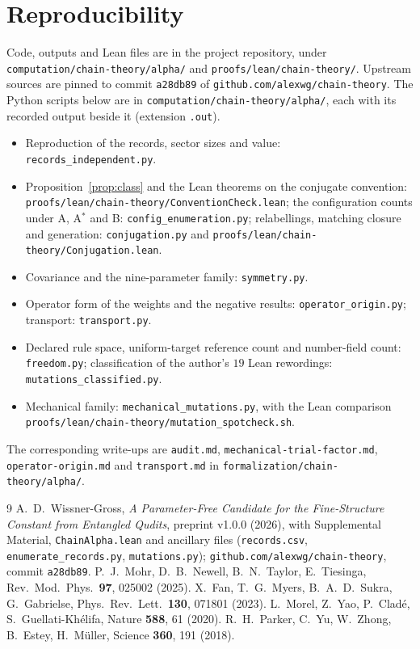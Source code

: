 \documentclass[11pt]{article}
\newcommand{\ident}[1]{\nolinkurl{#1}}
\theoremstyle{remark}
\begin{document}
\section*{Reproducibility}
Code, outputs and Lean files are in the project repository, under \ident{computation/chain-theory/alpha/} and \ident{proofs/lean/chain-theory/}. Upstream sources are pinned to commit \texttt{a28db89} of \ident{github.com/alexwg/chain-theory}. The Python scripts below are in \ident{computation/chain-theory/alpha/}, each with its recorded output beside it (extension \texttt{.out}).
\begin{itemize}
\item Reproduction of the records, sector sizes and value: \ident{records_independent.py}.
\item Proposition~\ref{prop:class} and the Lean theorems on the conjugate convention: \ident{proofs/lean/chain-theory/ConventionCheck.lean}; the configuration counts under A, A$^*$ and B: \ident{config_enumeration.py}; relabellings, matching closure and generation: \ident{conjugation.py} and \ident{proofs/lean/chain-theory/Conjugation.lean}.
\item Covariance and the nine-parameter family: \ident{symmetry.py}.
\item Operator form of the weights and the negative results: \ident{operator_origin.py}; transport: \ident{transport.py}.
\item Declared rule space, uniform-target reference count and number-field count: \ident{freedom.py}; classification of the author's $19$ Lean rewordings: \ident{mutations_classified.py}.
\item Mechanical family: \ident{mechanical_mutations.py}, with the Lean comparison \ident{proofs/lean/chain-theory/mutation_spotcheck.sh}.
\end{itemize}
The corresponding write-ups are \ident{audit.md}, \ident{mechanical-trial-factor.md}, \ident{operator-origin.md} and \ident{transport.md} in \ident{formalization/chain-theory/alpha/}.

\begin{thebibliography}{9}
 A.~D.~Wissner-Gross, \emph{A Parameter-Free Candidate for the Fine-Structure Constant from Entangled Qudits}, preprint v1.0.0 (2026), with Supplemental Material, \ident{ChainAlpha.lean} and ancillary files (\texttt{records.csv}, \ident{enumerate_records.py}, \ident{mutations.py}); \ident{github.com/alexwg/chain-theory}, commit \texttt{a28db89}.
 P.~J.~Mohr, D.~B.~Newell, B.~N.~Taylor, E.~Tiesinga, Rev.\ Mod.\ Phys.\ \textbf{97}, 025002 (2025).
 X.~Fan, T.~G.~Myers, B.~A.~D.~Sukra, G.~Gabrielse, Phys.\ Rev.\ Lett.\ \textbf{130}, 071801 (2023).
 L.~Morel, Z.~Yao, P.~Clad\'e, S.~Guellati-Kh\'elifa, Nature \textbf{588}, 61 (2020).
 R.~H.~Parker, C.~Yu, W.~Zhong, B.~Estey, H.~M\"uller, Science \textbf{360}, 191 (2018).
\end{thebibliography}
\end{document}

